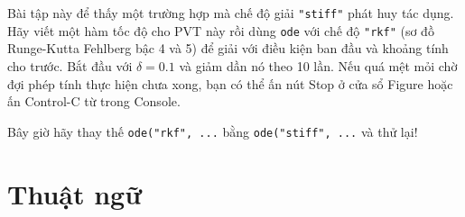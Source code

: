 \documentclass[12pt]{book}
\begin{document}
%

\begin{ex}
Bài tập này để thấy một trường hợp mà chế độ giải
\texttt{"stiff"} phát huy tác dụng.
Hãy viết một hàm tốc độ cho PVT này rồi dùng {\tt ode} với
chế độ \texttt{"rkf"} (sơ đồ Runge-Kutta Fehlberg bậc 4 và 5)
để giải với điều kiện ban đầu và khoảng tính cho trước.
Bắt đầu với $\delta = 0.1$ và giảm dần nó theo 10 lần. Nếu
quá mệt mỏi chờ đợi phép tính thực hiện chưa xong, bạn có thể
ấn nút Stop ở cửa sổ Figure hoặc ấn Control-C từ trong Console.

Bây giờ hãy thay thế {\tt ode("rkf", ...} bằng {\tt ode("stiff", ...} và thử lại!
\end{ex}



\section{Thuật ngữ}
\end{document}
